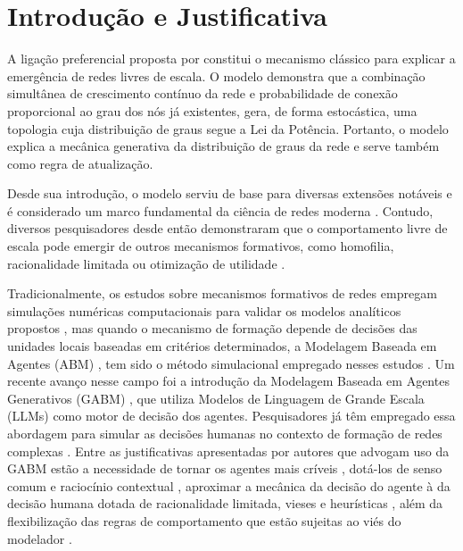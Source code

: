 \documentclass[12pt,oneside,a4paper,brazil,sumario=tradicional]{abntex2}
\begin{document}
\frenchspacing
\imprimircapa
\imprimirfolhaderosto
\tableofcontents
\clearpage
\textual
\markboth{}{}%


\section*{Introdução e Justificativa}
A ligação preferencial proposta por \textcite{barabasi1999} constitui o mecanismo clássico para explicar a emergência de redes livres de escala. O modelo demonstra que a combinação simultânea de crescimento contínuo da rede e probabilidade de conexão proporcional ao grau dos nós já existentes, gera, de forma estocástica, uma topologia cuja distribuição de graus segue a Lei da Potência. Portanto, o modelo explica a mecânica generativa da distribuição de graus da rede e serve também como regra de atualização.

Desde sua introdução, o modelo serviu de base para diversas extensões notáveis e é considerado um marco fundamental da ciência de redes moderna \parencite{latora2017, holme2019}. Contudo, diversos pesquisadores desde então demonstraram que o comportamento livre de escala pode emergir de outros mecanismos formativos, como homofilia, racionalidade limitada ou otimização de utilidade \parencite{caldarelli2002, vasquez2003, ferrericancho2003, dsouza2007, serrano2008, xu2010, papadopoulos2012}.

Tradicionalmente, os estudos sobre mecanismos formativos de redes empregam simulações numéricas computacionais para validar os modelos analíticos propostos \parencite{newman2003}, mas quando o mecanismo de formação depende de decisões das unidades locais baseadas em critérios determinados, a Modelagem Baseada em Agentes (ABM) \parencite{epstein1999, bonabeau2002}, tem sido o método simulacional empregado nesses estudos \parencite{skyrms2000, tomasello2014, zhou2011, du2024}. Um recente avanço nesse campo foi a introdução da Modelagem Baseada em Agentes Generativos (GABM) \parencite{ghaffarzadegan2024}, que utiliza Modelos de Linguagem de Grande Escala (LLMs) como motor de decisão dos agentes. Pesquisadores já têm empregado essa abordagem para simular as decisões humanas no contexto de formação de redes complexas \parencite{demarzo2023, piao2025, papachristou2025, ji2025, ji2025b}. Entre as justificativas apresentadas por autores que advogam uso da GABM estão a necessidade de tornar os agentes mais críveis \parencite{park2023, adornetto2025}, dotá-los de senso comum e raciocínio contextual \parencite{vezhnevets2023}, aproximar a mecânica da decisão do agente à da decisão humana dotada de racionalidade limitada, vieses e heurísticas \parencite{ghaffarzadegan2024}, além da flexibilização das regras de comportamento que estão sujeitas ao viés do modelador \parencite{lu2024, chopra2024, larooij2025}.
\end{document}
